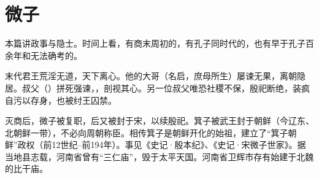 \chapter{微子}

本篇讲政事与隐士。时间上看，有商末周初的，有孔子同时代的，也有早于孔子百余年和无法确考的。

\bigskip

{
\item {}末代君王荒淫无道，天下离心。他的大哥（名启，庶母所生）屡谏无果，离朝隐居。叔父（）拼死强谏，，剖视其心。另一位叔父唯恐社稷不保，殷祀断绝，装疯自污以存身，也被纣王囚禁。

灭商后，微子被复职，后又被封于宋，以续殷祀。箕子被武王封于朝鲜（今辽东、北朝鲜一带），不必向周朝称臣。相传箕子是朝鲜开化的始祖，建立了“箕子朝鲜”政权（前12世纪--前194年）。事见《史记·殷本纪》、《史记·宋微子世家》。据当地县志载，河南省曾有“三仁庙”，毁于太平天国。河南省卫辉市存有始建于北魏的比干庙。
}
{}


